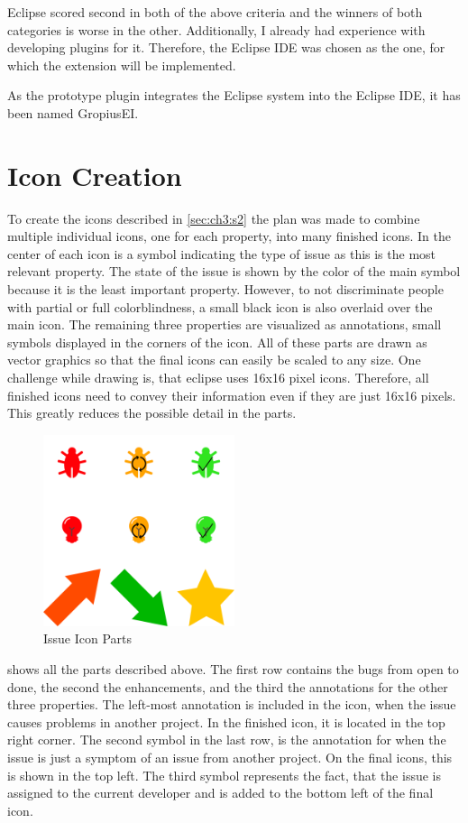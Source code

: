 \Gls{Eclipse} scored second in both of the above criteria and the winners of both categories is worse in the other.
Additionally, I already had experience with developing plugins for it.
Therefore, the \gls{Eclipse} \gls{IDE} was chosen as the one, for which the extension will be implemented.

As the prototype plugin integrates the \gls{Eclipse} system into the \gls{Eclipse} \gls{IDE}, it has been named \gls{GropiusEI}.

\section{Icon Creation}
\label{sec:ch4:s2}
To create the icons described in \cref{sec:ch3:s2} the plan was made to combine multiple individual icons, one for each property, into many finished icons.
In the center of each icon is a symbol indicating the type of issue as this is the most relevant property.
The state of the issue is shown by the color of the main symbol because it is the least important property.
However, to not discriminate people with partial or full colorblindness, a small black icon is also overlaid over the main icon.
The remaining three properties are visualized as annotations, small symbols displayed in the corners of the icon.
All of these parts are drawn as vector graphics so that the final icons can easily be scaled to any size.
One challenge while drawing is, that eclipse uses 16x16 pixel icons.
Therefore, all finished icons need to convey their information even if they are just 16x16 pixels.
This greatly reduces the possible detail in the parts.

\begin{figure}[!h]
	\centering
	\includegraphics[width=0.5\textwidth]{graphics/iconParts.png}
	\caption{Issue Icon Parts}
	\label{fig:c4:icon_parts}
\end{figure}
 shows all the parts described above.
The first row contains the bugs from open to done, the second the enhancements, and the third the annotations for the other three properties.
The left-most annotation is included in the icon, when the issue causes problems in another project.
In the finished icon, it is located in the top right corner.
The second symbol in the last row, is the annotation for when the issue is just a symptom of an issue from another project.
On the final icons, this is shown in the top left.
The third symbol represents the fact, that the issue is assigned to the current developer and is added to the bottom left of the final icon.


